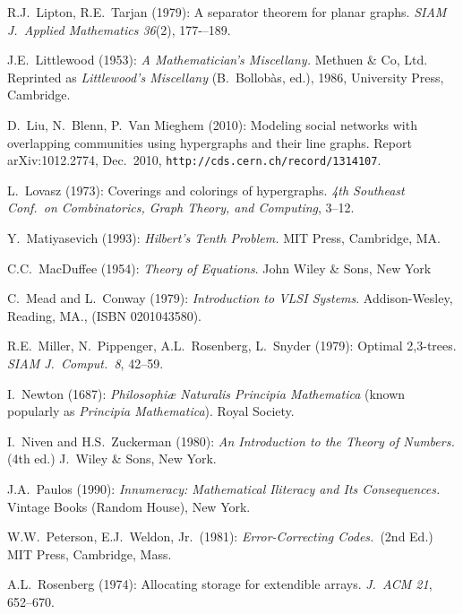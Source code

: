 \begin{thebibliography}{999}
R.J.~Lipton, R.E.~Tarjan (1979):
A separator theorem for planar graphs.
{\it SIAM J.~Applied Mathematics 36}(2), 177-–189.

J.E.~Littlewood (1953):
{\it A Mathematician's Miscellany.}
Methuen \& Co, Ltd.
Reprinted as {\it Littlewood's Miscellany} (B.~Bollob\`{a}s, ed.),
1986, University Press, Cambridge.

D.~Liu, N.~Blenn, P.~Van Mieghem (2010):
Modeling social networks with overlapping communities using
hypergraphs and their line graphs.
Report arXiv:1012.2774, Dec.~2010,
{\tt http://cds.cern.ch/record/1314107}.

L.~Lovasz (1973): Coverings and colorings of hypergraphs.  {\it 4th
  Southeast Conf.~on Combinatorics, Graph Theory, and Computing},
3--12.


Y.~Matiyasevich (1993):
{\it Hilbert's Tenth Problem.}
MIT Press, Cambridge, MA.

C.C.~MacDuffee (1954):
{\it Theory of Equations}.
John Wiley \& Sons, New York

C.~Mead and L.~Conway (1979):
{\it Introduction to VLSI Systems}.
Addison-Wesley, Reading, MA., (ISBN 0201043580).

R.E.~Miller, N.~Pippenger, A.L.~Rosenberg, L.~Snyder (1979): Optimal
2,3-trees.  {\it SIAM J.~Comput.~8}, 42--59.



I.~Newton (1687): {\it Philosophiæ Naturalis Principia Mathematica}
(known popularly as {\it Principia Mathematica}).
Royal Society.


I.~Niven and H.S.~Zuckerman (1980):
{\it An Introduction to the Theory of Numbers.} (4th ed.)
J.~Wiley \& Sons, New York.




J.A.~Paulos (1990):
{\it Innumeracy: Mathematical Iliteracy and Its Consequences.}
Vintage Books (Random House), New York.

W.W.~Peterson, E.J.~Weldon, Jr.~(1981):
{\it Error-Correcting Codes.}~(2nd Ed.)
MIT Press, Cambridge, Mass.



A.L.~Rosenberg (1974): Allocating storage for extendible arrays.  {\it
J.~ACM 21}, 652--670.


\end{thebibliography}
